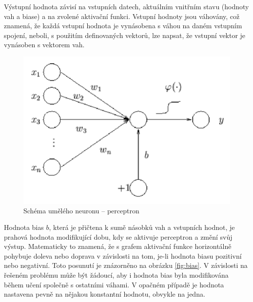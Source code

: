 Výstupní hodnota závisí na vstupních datech, aktuálním vnitřním stavu (hodnoty vah a biase) a na zvolené aktivační funkci. Vstupní hodnoty jsou váhovány, což znamená, že každá vstupní hodnota je vynásobena s váhou na daném vstupním spojení, neboli, s použitím definovaných vektorů, lze napsat, že vstupní vektor je vynásoben s vektorem vah.

\begin{figure}[H]
    \centering
    \includegraphics[scale=0.35]{obrazky-figures/perceptron.png}
    \caption{\label{fig:neuron}Schéma umělého neuronu -- perceptron}
\end{figure}

Hodnota bias $b$, která je přičtena k sumě násobků vah a vstupních hodnot, je prahová hodnota modifikující dobu, kdy se aktivuje perceptron a změní svůj výstup. Matematicky to znamená, že s grafem aktivační funkce horizontálně pohybuje doleva nebo doprava v závislosti na tom, je-li hodnota biasu pozitivní nebo negativní. Toto posunutí je znázorněno na obrázku \ref{fig:bias}. V závislosti na řešeném problému může být žádoucí, aby i hodnota bias byla modifikována během učení společně s ostatními váhami. V opačném případě je hodnota nastavena pevně na nějakou konstantní hodnotu, obvykle na jedna.


